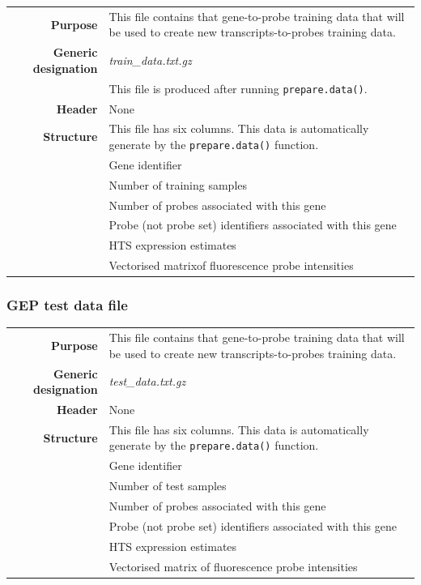 \documentclass[a4paper,12pt]{article}
\begin{document}
\begin{tabular}{rp{12cm}}
\textbf{Purpose} & This file contains that gene-to-probe training data that will be used to create new transcripts-to-probes training data. \\
\textbf{Generic designation} & \textit{train\_data.txt.gz} \\
  & This file is produced after running \texttt{prepare.data()}. \\
\textbf{Header} & None \\
\textbf{Structure} & This file has six columns. This data is automatically generate by the \texttt{prepare.data()} function. \\
  & Gene identifier \\
  & Number of training samples \\
  & Number of probes associated with this gene \\
  & Probe (not probe set) identifiers associated with this gene \\
  & HTS expression estimates \\
  & Vectorised matrix\footnotemark[1] of fluorescence probe intensities \\
\end{tabular}

\subsubsection{GEP test data file}
\label{tiep:gep_test}

\begin{tabular}{rp{12cm}}
\textbf{Purpose} & This file contains that gene-to-probe training data that will be used to create new transcripts-to-probes training data. \\
\textbf{Generic designation} & \textit{test\_data.txt.gz} \\
\textbf{Header} & None \\
\textbf{Structure} & This file has six columns. This data is automatically generate by the \texttt{prepare.data()} function. \\
  & Gene identifier \\
  & Number of test samples \\
  & Number of probes associated with this gene \\
  & Probe (not probe set) identifiers associated with this gene \\
  & HTS expression estimates \\
  & Vectorised matrix of fluorescence probe intensities
\end{tabular}
\end{document}
